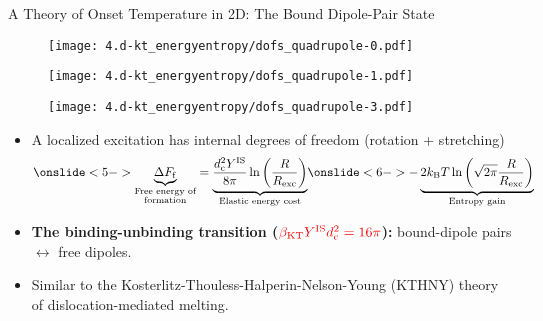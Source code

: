 \begin{frame}{A Theory of Onset Temperature in 2D: The Bound Dipole-Pair State}

\begin{figure}
\begin{overprint}

\centering\texttt{[image: 4.d-kt\_energyentropy/dofs\_quadrupole-0.pdf]}

\centering\texttt{[image: 4.d-kt\_energyentropy/dofs\_quadrupole-1.pdf]}

\centering\texttt{[image: 4.d-kt\_energyentropy/dofs\_quadrupole-3.pdf]}

\end{overprint}
    
\end{figure}

\vspace{-10pt}

\begin{itemize}
\item<1-> A localized excitation has internal degrees of freedom (rotation + stretching)
\begin{equation*}
\onslide<5->{\underbrace{\Delta F_\mathrm{f}}_{\substack{\text{Free energy of} \\ \text{formation}}} = \underbrace{ \frac{d_{\mathrm{c}}^{2} Y^{\mathrm{IS}}}{8 \pi} \ln \left(\frac{R}{R_{\mathrm{exc}}}\right) }_{\substack{\text{Elastic energy cost}}}} \onslide<6->{-\underbrace{2 k_\mathrm{B} T \ln \left(\sqrt{2 \pi} \frac{R}{R_\mathrm{exc}} \right)}_{\substack{\text{Entropy gain} }}}
\end{equation*}
\vspace{-9pt}
\item<7-> \textbf{The binding-unbinding transition (${\color{red}\beta_\mathrm{KT} Y^\mathrm{IS} d_\mathrm{c}^2 = 16 \pi}$):} bound-dipole pairs $\leftrightarrow$ free dipoles. 
\item<8->{Similar to the Kosterlitz-Thouless-Halperin-Nelson-Young (KTHNY) theory of dislocation-mediated melting}.

\end{itemize}
\vspace{8pt}



    
\end{frame}